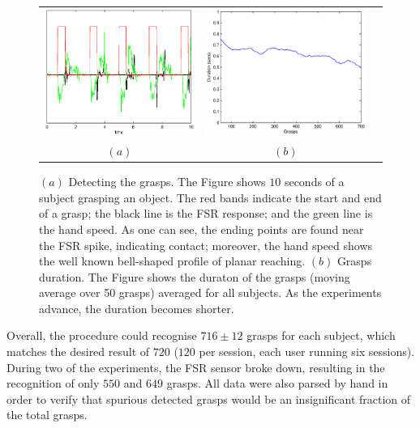 \begin{figure}[htbp]
  \begin{center}
    \begin{tabular}{ccc}
      \includegraphics[width=0.48\linewidth]{grasp_seq_scotch.eps} &
      \includegraphics[width=0.48\linewidth]{grasp_trend.eps} \\
      $(a)$ & $(b)$
    \end{tabular}
    \caption{$(a)$ Detecting the grasps. The Figure shows $10$ seconds
    of a subject grasping an object. The red bands indicate the start
    and end of a grasp; the black line is the FSR response; and the
    green line is the hand speed. As one can see, the ending points
    are found near the FSR spike, indicating contact; moreover, the
    hand speed shows the well known bell-shaped profile of planar reaching. 
    $(b)$ Grasps duration. The Figure shows the duraton of the
    grasps (moving average over 50 grasps) averaged for all
    subjects. As the experiments advance, the duration becomes shorter.}
    \label{fig:grasp_sequence}
  \end{center}
\end{figure}

Overall, the procedure could recognise $716 \pm 12$ grasps for each
subject, which matches the desired result of $720$ ($120$ per session,
each user running six sessions). During two of the experiments, the
FSR sensor broke down, resulting in the recognition of only $550$
and $649$ grasps. All data were also parsed by hand 
in order to verify that spurious detected grasps would be an
insignificant fraction of the total grasps.

